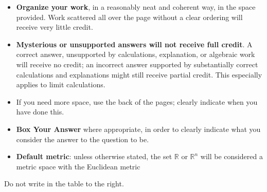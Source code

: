 \documentclass[11pt]{exam}
\theoremstyle{definition}
\begin{document}
\begin{minipage}[t]{3.7in}
\vspace{0pt}
\begin{itemize}


\item \textbf{Organize your work}, in a reasonably neat and coherent way, in
the space provided. Work scattered all over the page without a clear ordering will 
receive very little credit.  

\item \textbf{Mysterious or unsupported answers will not receive full
credit}.  A correct answer, unsupported by calculations, explanation,
or algebraic work will receive no credit; an incorrect answer supported
by substantially correct calculations and explanations might still receive
partial credit.  This especially applies to limit calculations.

\item If you need more space, use the back of the pages; clearly indicate when you have done this.

\item \textbf{Box Your Answer} where appropriate, in order to clearly indicate what you consider the answer to the question to be.

\item \textbf{Default metric}: unless otherwise stated, the set $\mathbb{R}$ or $\mathbb{R}^n$ will be considered a metric space with the Euclidean metric
\end{itemize}

Do not write in the table to the right.
\end{minipage}
\hfill
\begin{minipage}[t]{2.3in}
\vspace{0pt}
\addpoints %
\gradetable[v]%

\end{minipage}
\newpage %

%
%
\end{document}
